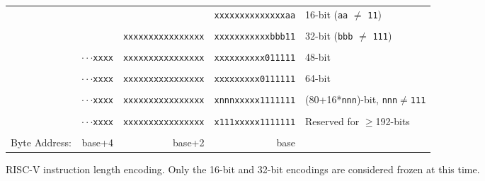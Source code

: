 \begin{figure}[hbt]
{
\begin{center}
\begin{tabular}{ccccl}
\cline{4-4}
& & & \multicolumn{1}{|c|}{\tt xxxxxxxxxxxxxxaa} & 16-bit ({\tt aa}
$\neq$ {\tt 11})\\
\cline{4-4}
\\
\cline{3-4}
& & \multicolumn{1}{|c|}{\tt xxxxxxxxxxxxxxxx}
& \multicolumn{1}{c|}{\tt xxxxxxxxxxxbbb11} & 32-bit ({\tt bbb}
$\neq$ {\tt 111}) \\
\cline{3-4}
\\
\cline{2-4}
\hspace{0.1in} 
& \multicolumn{1}{c|}{$\cdot\cdot\cdot${\tt xxxx} }
& \multicolumn{1}{c|}{\tt xxxxxxxxxxxxxxxx}
& \multicolumn{1}{c|}{\tt xxxxxxxxxx011111} & 48-bit \\
\cline{2-4}
\\
\cline{2-4}
\hspace{0.1in} 
& \multicolumn{1}{c|}{$\cdot\cdot\cdot${\tt xxxx} }
& \multicolumn{1}{c|}{\tt xxxxxxxxxxxxxxxx}
& \multicolumn{1}{c|}{\tt xxxxxxxxx0111111} & 64-bit \\
\cline{2-4}
\\
\cline{2-4}
\hspace{0.1in} 
& \multicolumn{1}{c|}{$\cdot\cdot\cdot${\tt xxxx} }
& \multicolumn{1}{c|}{\tt xxxxxxxxxxxxxxxx}
& \multicolumn{1}{c|}{\tt xnnnxxxxx1111111} & (80+16*{\tt nnn})-bit,
       {\tt nnn}$\neq${\tt 111} \\
\cline{2-4}
\\
\cline{2-4}
\hspace{0.1in} 
& \multicolumn{1}{c|}{$\cdot\cdot\cdot${\tt xxxx} }
& \multicolumn{1}{c|}{\tt xxxxxxxxxxxxxxxx}
& \multicolumn{1}{c|}{\tt x111xxxxx1111111} & Reserved for $\geq$192-bits \\
\cline{2-4}
\\
Byte Address: & \multicolumn{1}{r}{base+4} & \multicolumn{1}{r}{base+2} & \multicolumn{1}{r}{base} & \\
 \end{tabular}
\end{center}
}
\caption{RISC-V instruction length encoding.  Only the 16-bit and 32-bit encodings are considered frozen at this time.}
\label{instlengthcode}
\end{figure}

